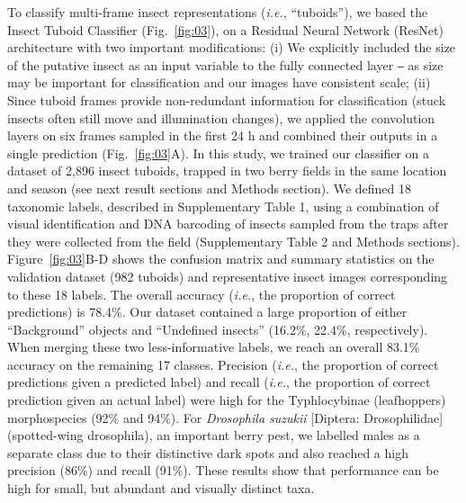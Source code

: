 \documentclass[12pt]{article}
\begin{document}
\begin{linenumbers}
		To classify multi-frame insect representations (\emph{i.e.}, “tuboids”), we based the Insect Tuboid Classifier (Fig.~\ref{fig:03}), on a Residual Neural Network (ResNet) architecture\cite{he_deep_2016} with two important modifications: (i) We explicitly included the size of the putative insect as an input variable to the fully connected layer ‒ as size may be important for classification and our images have consistent scale; (ii) Since tuboid frames provide non-redundant information for classification (stuck insects often still move and illumination changes), we applied the convolution layers on six frames sampled in the first 24 h and combined their outputs in a single prediction (Fig.~\ref{fig:03}A). In this study, we trained our classifier on a dataset of 2,896 insect tuboids, trapped in two berry fields in the same location and season (see next result sections and Methods section). We defined 18 taxonomic labels, described in Supplementary Table 1, using a combination of visual identification and DNA barcoding of insects sampled from the traps after they were collected from the field (Supplementary Table 2 and Methods sections). Figure~\ref{fig:03}B-D shows the confusion matrix and summary statistics on the validation dataset (982 tuboids) and representative insect images corresponding to these 18 labels. The overall accuracy (\emph{i.e.}, the proportion of correct predictions) is 78.4\%. Our dataset contained a large proportion of either “Background” objects and “Undefined insects” (16.2\%, 22.4\%, respectively). When merging these two less-informative labels, we reach an overall 83.1\% accuracy on the remaining 17 classes. Precision (\emph{i.e.}, the proportion of correct predictions given a predicted label) and recall (\emph{i.e.}, the proportion of correct prediction given an actual label) were high for the Typhlocybinae (leafhoppers) morphospecies (92\% and 94\%). For \emph{Drosophila suzukii} [Diptera: Drosophilidae] (spotted-wing drosophila), an important berry pest, we labelled males as a separate class due to their distinctive dark spots and also reached a high precision (86\%) and recall (91\%). These results show that performance can be high for small, but abundant and visually distinct taxa.


\end{linenumbers}
\end{document}

